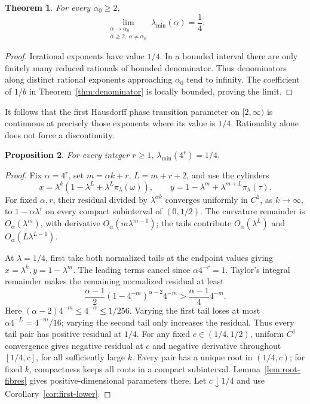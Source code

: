 \documentclass[11pt,a4paper]{amsart}
\numberwithin{equation}{section}
\newtheorem{theorem}{Theorem}[section]
\newtheorem{proposition}[theorem]{Proposition}
\theoremstyle{definition}
\begin{document}
\begin{theorem}\label{thm:punctured-limit}
For every \(\alpha_0\geq2\),
\[
\lim_{\substack{\alpha\to \alpha_0\\\alpha\geq2,\ \alpha\ne \alpha_0}}\lambda_{\min}(\alpha)=\frac14.
\]
\end{theorem}
\begin{proof}
Irrational exponents have value \(1/4\).
In a bounded interval there are only finitely many reduced rationals
of bounded denominator. Thus denominators along distinct rational
exponents approaching \(\alpha_0\) tend to infinity.
The coefficient of \(1/b\) in Theorem~\ref{thm:denominator} is
locally bounded, proving the limit.
\end{proof}

It follows that the first Hausdorff phase transition parameter on \([2,\infty)\) is continuous
at precisely those exponents where its value is \(1/4\).
Rationality alone does not force a discontinuity.

\begin{proposition}\label{prop:powers-four}
For every integer \(r\geq1\), \(\lambda_{\min}(4^r)=1/4\).
\end{proposition}
\begin{proof}
Fix \(\alpha=4^r\), set \(m=\alpha k+r\), \(L=m+r+2\), and use the cylinders
\[
x=\lambda^k(1-\lambda^L+\lambda^L\pi_\lambda(\omega)),
\qquad
y=1-\lambda^m+\lambda^{m+L}\pi_\lambda(\tau).
\]
For fixed \(\alpha,r\), their residual divided by \(\lambda^{\alpha k}\)
converges uniformly in \(C^1\), as \(k\to\infty\), to
\(1-\alpha\lambda^r\) on every compact subinterval of \((0,1/2)\).
The curvature remainder is \(O_\alpha(\lambda^m)\), with derivative
\(O_\alpha(m\lambda^{m-1})\); the tails contribute
\(O_\alpha(\lambda^L)\) and \(O_\alpha(L\lambda^{L-1})\).

At \(\lambda=1/4\), first take both normalized tails at the
endpoint values giving \(x=\lambda^k,y=1-\lambda^m\).
The leading terms cancel since \(\alpha4^{-r}=1\). Taylor's integral
remainder makes the remaining normalized residual at least
\[
\frac{\alpha-1}{2}(1-4^{-m})^{\alpha-2}4^{-m}
>\frac{\alpha-1}{4}4^{-m}.
\]
Here \((\alpha-2)4^{-m}\leq4^{-\alpha}\leq1/256\).
Varying the first tail loses at most
\(\alpha4^{-L}=4^{-m}/16\); varying the second tail only increases
the residual. Thus every tail pair has positive residual at \(1/4\).
For any fixed \(c\in(1/4,1/2)\), uniform \(C^1\) convergence gives
negative residual at \(c\) and negative derivative throughout
\([1/4,c]\), for all sufficiently large \(k\).
Every pair has a unique root in \((1/4,c)\); for fixed \(k\),
compactness keeps all roots in a compact subinterval.
Lemma~\ref{lem:root-fibres} gives positive-dimensional parameters
there. Let \(c\downarrow1/4\) and use Corollary~\ref{cor:first-lower}.
\end{proof}
\end{document}
